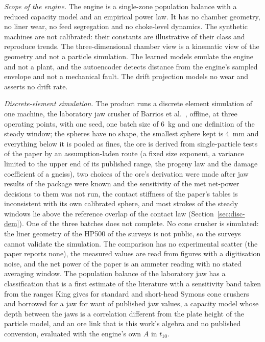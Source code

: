\emph{Scope of the engine.} The engine is a single-zone population balance with a reduced capacity model and an empirical power law. It has no chamber
geometry, no liner wear, no feed segregation and no choke-level dynamics. The synthetic machines are not calibrated: their constants are illustrative
of their class and reproduce trends. The three-dimensional chamber view is a kinematic view of the geometry and not a particle simulation. The learned
models emulate the engine and not a plant, and the autoencoder detects distance from the engine's sampled envelope and not a mechanical fault. The drift
projection models no wear and asserts no drift rate.

\emph{Discrete-element simulation.} The product runs a discrete element simulation of one machine, the laboratory jaw crusher of Barrios et al.~\cite{barrios2020}, offline, at three operating points, with one seed, one batch size of $6$~kg and one definition of the steady window; the spheres have no shape, the smallest sphere kept is $4$~mm and everything below it is pooled as fines, the ore is derived from single-particle tests of the paper by an assumption-laden route (a fixed size exponent, a variance limited to the upper end of its published range, the progeny law and the damage coefficient of a gneiss), two choices of the ore's derivation were made after jaw results of the package were known and the sensitivity of the met net-power decisions to them was not run, the contact stiffness of the paper's tables is inconsistent with its own calibrated sphere, and most strokes of the steady windows lie above the reference overlap of the contact law (Section~\ref{sec:disc-dem}). One of the three batches does not complete. No cone crusher is simulated: the liner geometry of the HP500 of the surveys is not public, so the surveys cannot validate the simulation. The comparison has no experimental scatter (the paper reports none), the measured values are read from figures with a digitisation noise, and the net power of the paper is an ammeter reading with no stated averaging window. The population balance of the laboratory jaw has a classification that is a first estimate of the literature with a sensitivity band taken from the ranges King gives for standard and short-head Symons cone crushers and borrowed for a jaw for want of published jaw values, a capacity model whose depth between the jaws is a correlation different from the plate height of the particle model, and an ore link that is this work's algebra and no published conversion, evaluated with the engine's own $A$ in $t_{10}$.

